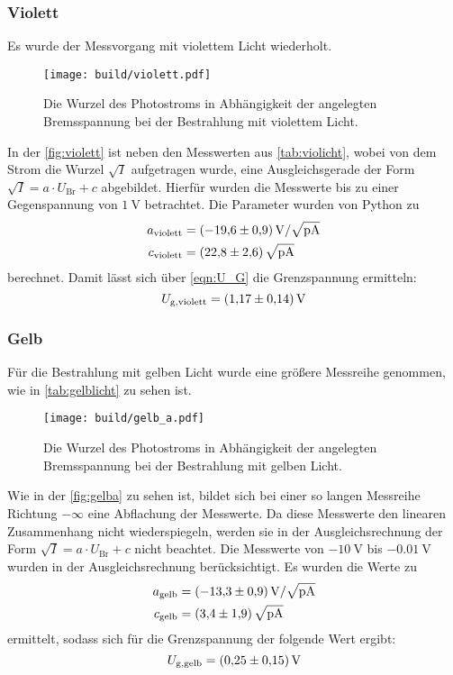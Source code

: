 \subsubsection{Violett}
Es wurde der Messvorgang mit violettem Licht wiederholt.
\begin{figure}[H]
  \texttt{[image: build/violett.pdf]}
  \caption{Die Wurzel des Photostroms in Abhängigkeit der angelegten Bremsspannung bei der Bestrahlung mit violettem Licht.}
  \label{fig:violett}
\end{figure}
\noindent
In der \autoref{fig:violett} ist neben den Messwerten aus \autoref{tab:violicht}, wobei von dem Strom die Wurzel $\sqrt{I}$ aufgetragen wurde, 
eine Ausgleichsgerade der Form $\sqrt{I} = a \cdot U_{\text{Br}} + c $ abgebildet.
Hierfür wurden die Messwerte bis zu einer Gegenspannung von $\SI{1}{\volt}$ betrachtet.
Die Parameter wurden von Python zu
\begin{align*}
  a_{\text{violett}} &= \SI{-19.6\pm 0.9}{\volt\per\sqrt{\pico\ampere}}\\
  c_{\text{violett}} &= \SI{22.8 \pm 2.6}{\sqrt{\pico\ampere}}
\end{align*}
berechnet.
Damit lässt sich über \eqref{eqn:U_G} die Grenzspannung ermitteln:
\begin{equation*}
  U_{\text{g},\text{violett}} = \SI{1.17 \pm 0.14}{\volt}
\end{equation*}

\subsubsection{Gelb}
Für die Bestrahlung mit gelben Licht wurde eine größere Messreihe genommen, wie in \autoref{tab:gelblicht} zu sehen ist.
\begin{figure}[H]
  \texttt{[image: build/gelb\_a.pdf]}
  \caption{Die Wurzel des Photostroms in Abhängigkeit der angelegten Bremsspannung bei der Bestrahlung mit gelben Licht.}
  \label{fig:gelba}
\end{figure}
\noindent
Wie in der \autoref{fig:gelba} zu sehen ist, bildet sich bei einer so langen Messreihe Richtung $-\infty$ eine Abflachung der Messwerte.
Da diese Messwerte den linearen Zusammenhang nicht wiederspiegeln, werden sie in der Ausgleichsrechnung der Form $\sqrt{I} = a \cdot U_{\text{Br}} + c $ nicht beachtet.
Die Messwerte von $\SI{-10}{\volt}$ bis $\SI{-0.01}{\volt}$ wurden in der Ausgleichsrechnung berücksichtigt.
Es wurden die Werte zu 
\begin{align*}
  a_{\text{gelb}} &= \SI{-13.3 \pm 0.9}{\volt\per\sqrt{\pico\ampere}}\\
  c_{\text{gelb}} &= \SI{3.4 \pm 1.9}{\sqrt{\pico\ampere}}
\end{align*}
ermittelt, sodass sich für die Grenzspannung der folgende Wert ergibt:
\begin{equation*}
  U_{\text{g},\text{gelb}} = \SI{0.25 \pm 0.15}{\volt}
\end{equation*}

